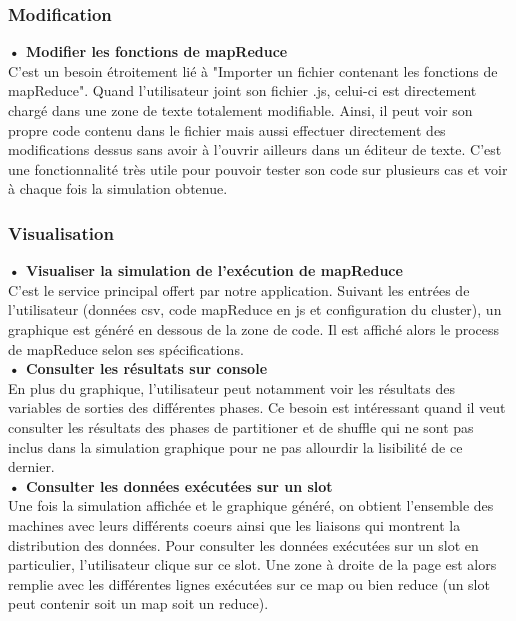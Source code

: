 \documentclass[12pt,a4paper]{article}
\begin{document}
\subsubsection{Modification} 

\textbf{• Modifier les fonctions de mapReduce\\} C'est un besoin étroitement lié à "Importer un fichier contenant les fonctions de mapReduce". Quand l'utilisateur joint son fichier .js, celui-ci est directement chargé dans une zone de texte totalement modifiable. Ainsi, il peut voir son propre code contenu dans le fichier mais aussi effectuer directement des modifications dessus sans avoir à l'ouvrir ailleurs dans un éditeur de texte. C'est une fonctionnalité très utile pour pouvoir tester son code sur plusieurs cas et voir à chaque fois la simulation obtenue.  \\

\subsubsection{Visualisation}

\textbf{•  Visualiser la simulation de l'exécution de mapReduce\\} C'est le service principal offert par notre application. Suivant les entrées de l'utilisateur (données csv, code mapReduce en js et configuration du cluster), un graphique est généré en dessous de la zone de code. Il est affiché alors le process de mapReduce selon ses spécifications.\\

\textbf{• Consulter les résultats sur console\\} En plus du graphique, l'utilisateur peut notamment voir les résultats des variables de sorties des différentes phases. Ce besoin est intéressant quand il veut consulter les résultats des phases de partitioner et de shuffle qui ne sont pas inclus dans la simulation graphique pour ne pas allourdir la lisibilité de ce dernier.\\

\textbf{• Consulter les données exécutées sur un slot\\} Une fois la simulation affichée et le graphique généré, on obtient l'ensemble des machines avec leurs différents coeurs ainsi que les liaisons qui montrent la distribution des données. Pour consulter les données exécutées sur un slot en particulier, l'utilisateur clique sur ce slot. Une zone à droite de la page est alors remplie avec les différentes lignes exécutées sur ce map ou bien reduce (un slot peut contenir soit un map soit un reduce).\\ 
 
\end{document}
